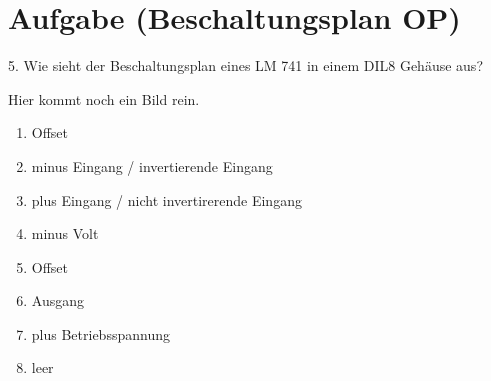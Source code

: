 \section{Aufgabe (Beschaltungsplan OP)}%
\label{sec:aufgabe_5}

5. Wie sieht der Beschaltungsplan eines LM 741 in einem DIL8 Gehäuse aus?


Hier kommt noch ein Bild rein.

\begin{enumerate}
    \item Offset
        \item minus Eingang / invertierende Eingang
            \item plus Eingang / nicht invertirerende Eingang
                \item minus Volt
                    \item Offset
                        \item Ausgang
                            \item plus Betriebsspannung
                                \item leer
\end{enumerate}
